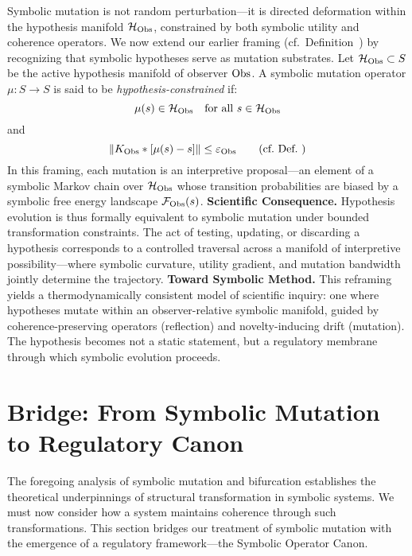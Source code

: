 \begin{scholium}
\label{scholium:bk6_hypotheses_as_regulatory_mutation_manifolds}
Symbolic mutation is not random perturbation—it is directed deformation within the hypothesis manifold $\mathcal{H}_{\mathrm{Obs}}$, constrained by both symbolic utility and coherence operators. We now extend our earlier framing (cf.~Definition~) by recognizing that symbolic hypotheses serve as mutation substrates.
Let $\mathcal{H}_{\mathrm{Obs}} \subset S$ be the active hypothesis manifold of observer $\mathrm{Obs}$. A symbolic mutation operator $\mu : S \to S$ is said to be \emph{hypothesis-constrained} if:
\begin{equation}
\mu(s) \in \mathcal{H}_{\mathrm{Obs}} \quad \text{for all } s \in \mathcal{H}_{\mathrm{Obs}}
\end{equation}
and
\begin{equation}
\|K_{\mathrm{Obs}} \ast [\mu(s) - s]\| \leq \varepsilon_{\mathrm{Obs}} \qquad \text{(cf.~Def.~)}
\end{equation}
In this framing, each mutation is an interpretive proposal—an element of a symbolic Markov chain over $\mathcal{H}_{\mathrm{Obs}}$ whose transition probabilities are biased by a symbolic free energy landscape $\mathcal{F}_{\mathrm{Obs}}(s)$.
\textbf{Scientific Consequence.} Hypothesis evolution is thus formally equivalent to symbolic mutation under bounded transformation constraints. The act of testing, updating, or discarding a hypothesis corresponds to a controlled traversal across a manifold of interpretive possibility—where symbolic curvature, utility gradient, and mutation bandwidth jointly determine the trajectory.
\textbf{Toward Symbolic Method.} This reframing yields a thermodynamically consistent model of scientific inquiry: one where hypotheses mutate within an observer-relative symbolic manifold, guided by coherence-preserving operators (reflection) and novelty-inducing drift (mutation). The hypothesis becomes not a static statement, but a regulatory membrane through which symbolic evolution proceeds.
\end{scholium}
\section{Bridge: From Symbolic Mutation to Regulatory Canon}
\label{sec:bk6_bridge_from_symbolic_mutation_to_regulatory_canon}
The foregoing analysis of symbolic mutation and bifurcation establishes the theoretical underpinnings of structural transformation in symbolic systems. We must now consider how a system maintains coherence through such transformations. This section bridges our treatment of symbolic mutation with the emergence of a regulatory framework—the Symbolic Operator Canon.
